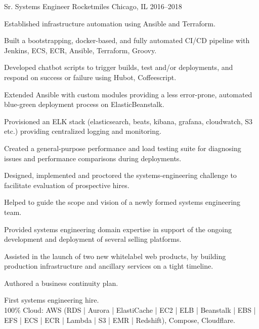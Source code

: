 

\begin{cventries}

  \cventry
    {Sr. Systems Engineer} %
    {Rocketmiles} %
    {Chicago, IL} %
    {2016--2018} %
    {
      \begin{cvitems} %
        \item {Established infrastructure automation using Ansible and Terraform.}
        \item {Built a bootstrapping, docker-based, and fully automated CI/CD pipeline with Jenkins, ECS, ECR, Ansible, Terraform, Groovy.}
        \item {Developed chatbot scripts to trigger builds, test and/or deployments, and respond on success or failure using Hubot, Coffeescript.}
        \item {Extended Ansible with custom modules providing a less error-prone, automated blue-green deployment process on ElasticBeanstalk.}
        \item {Provisioned an ELK stack (elasticsearch, beats, kibana, grafana, cloudwatch, S3 etc.) providing centralized logging and monitoring.}
        \item {Created a general-purpose performance and load testing suite for diagnosing issues and performance comparisons during deployments.}
        \item {Designed, implemented and proctored the systems-engineering challenge to facilitate evaluation of prospective hires.}
        \item {Helped to guide the scope and vision of a newly formed systems engineering team.}
        \item {Provided systems engineering domain expertise in support of the ongoing development and deployment of several selling platforms.}
        \item {Assisted in the launch of two new whitelabel web products, by building production infrastructure and ancillary services on a tight timeline.}
        \item {Authored a business continuity plan.}
      \end{cvitems}
    }
    {
      \begin{cventrysummary} %
        First systems engineering hire. \\
        100\% Cloud: AWS (RDS | Aurora | ElastiCache | EC2 | ELB | Beanstalk | EBS | EFS | ECS | ECR | Lambda | S3 | EMR | Redshift), Compose, Cloudflare.
      \end{cventrysummary}
    }


\end{cventries}
